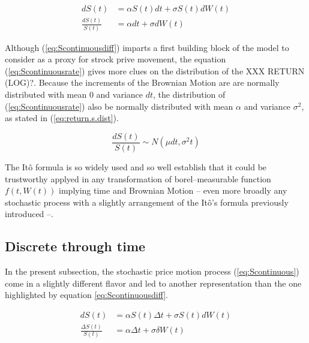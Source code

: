 \documentclass[12pt]{report}
\newcommand{\dBm}{dW\left(t\right)}
\newcommand{\DBm}{\delta{W\left(t\right)}}
\newcommand{\Bm}{W\left(t\right)}
\newcommand{\Dt}{\Delta t}
\newcommand{\ft}{f\left(t, \Bm \right)}
\newcommand{\St}{S\left(t\right)}
\newcommand{\dSt}{dS\left(t\right)}
\newcommand{\DSt}{\Delta S\left(t\right)}
\newcommand{\dSr}{\frac{\dSt}{\St}}
\newcommand{\DSr}{\frac{\DSt}{\St}}
\newcommand{\Scontinousdiff}{d\St &= \alpha \St dt + \sigma \St \dBm}
\newcommand{\Scontinuousrate}{\dSr &= \alpha dt + \sigma \dBm}
\newcommand{\Sdiscretediff}{d\St &= \alpha \St \Dt + \sigma \St \dBm}
\newcommand{\Sdiscreterate}{\DSr &= \alpha \Delta t + \sigma \DBm}
\begin{document}
\begin{center}
  \begin{subequations}
    \begin{align}
      \Scontinousdiff \label{eq:Scontinuousdiff} \\
      \Scontinuousrate \label{eq:Scontinuousrate}
    \end{align}
  \end{subequations}
\end{center}

Although (\ref{eq:Scontinuousdiff}) imparts a first building block of the model to consider as a proxy for strock prive movement,  the equation (\ref{eq:Scontinuousrate}) gives more clues on the distribution of the XXX RETURN (LOG)?. 
Because the increments of the Brownian Motion are are normally distributed with mean $0$ and variance $dt$, the distribution of (\ref{eq:Scontinuousrate}) also be normally distributed with mean $\alpha$ and variance $\sigma^2$, as stated in (\ref{eq:return.s.dist}).

\begin{center}
  \begin{equation}
     \dSr \sim N(\mu dt, \sigma^2 t)
     \label{eq:return.s.dist}
  \end{equation}
\end{center}

The Itô formula is so widely used and so well establish that it could be trustworthy applyed  in any transformation of borel--measurable function $\ft$ implying time and Brownian Motion -- even more broadly any stochastic process with a slightly arrangement of the Itô's formula previously introduced --.

\subsection{Discrete through time}
\label{sub:Discrete through time}

In the present subsection, the stochastic price motion process (\ref{eq:Scontinuous}) come in a slightly different flavor and led to another representation than the one highlighted by equation \ref{eq:Scontinuousdiff}.

\begin{center}
  \begin{subequations}
    \begin{align}
      \Sdiscretediff \label{eq:Sdiscretediff} \\
      \Sdiscreterate \label{eq:Sdiscreterate}
    \end{align}
  \end{subequations}
\end{center}
\end{document}
